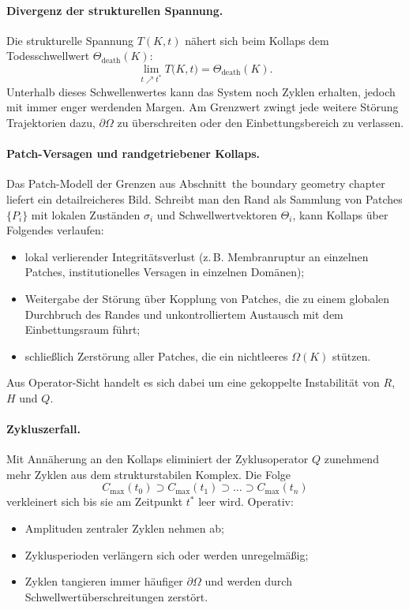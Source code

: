 \paragraph{Divergenz der strukturellen Spannung.}
Die strukturelle Spannung \(T(K,t)\) nähert sich beim Kollaps dem Todesschwellwert
\(\Theta_{\mathrm{death}}(K)\):
\[
  \lim_{t\nearrow t^{\ast}} T\big(K,t\big)
    = \Theta_{\mathrm{death}}(K).
\]
Unterhalb dieses Schwellenwertes kann das System noch Zyklen erhalten, jedoch mit
immer enger werdenden Margen. Am Grenzwert zwingt jede weitere Störung
Trajektorien dazu, \(\partial\Omega\) zu überschreiten oder den
Einbettungsbereich zu verlassen.

\paragraph{Patch-Versagen und randgetriebener Kollaps.}
Das Patch-Modell der Grenzen aus
Abschnitt~the boundary geometry chapter liefert ein detailreicheres Bild.
Schreibt man den Rand als Sammlung von Patches \(\{P_i\}\) mit lokalen Zuständen
\(\sigma_i\) und Schwellwertvektoren \(\Theta_i\), kann Kollaps über
Folgendes verlaufen:
\begin{itemize}
  \item lokal verlierender Integritätsverlust (z.\,B. Membranruptur an einzelnen
        Patches, institutionelles Versagen in einzelnen Domänen);
  \item Weitergabe der Störung über Kopplung von Patches, die zu einem globalen
        Durchbruch des Randes und unkontrolliertem Austausch mit dem
        Einbettungsraum führt;
  \item schließlich Zerstörung aller Patches, die ein nichtleeres
        \(\Omega(K)\) stützen.
\end{itemize}
Aus Operator-Sicht handelt es sich dabei um eine gekoppelte Instabilität von
\(R\), \(H\) und \(Q\).

\paragraph{Zykluszerfall.}
Mit Annäherung an den Kollaps eliminiert der Zyklusoperator \(Q\) zunehmend
mehr Zyklen aus dem strukturstabilen Komplex. Die Folge
\[
  C_{\max}(t_0)
  \supset C_{\max}(t_1)
  \supset \dots
  \supset C_{\max}(t_n)
\]
verkleinert sich bis sie am Zeitpunkt \(t^{\ast}\) leer wird. Operativ:
\begin{itemize}
  \item Amplituden zentraler Zyklen nehmen ab;
  \item Zyklusperioden verlängern sich oder werden unregelmäßig;
  \item Zyklen tangieren immer häufiger \(\partial\Omega\) und werden durch
        Schwellwertüberschreitungen zerstört.
\end{itemize}

